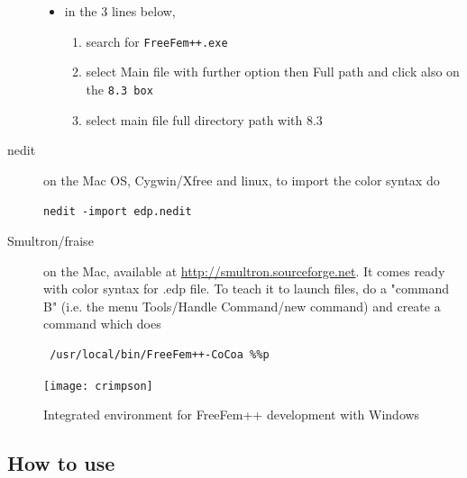 \documentclass[a4paper,twoside,12pt]{book}
\begin{document}
\begin{description}
\begin{itemize}
\item in the 3 lines below,
\begin{enumerate}
\item search for \texttt{FreeFem++.exe}
\item select Main file with further option then Full path and click also on the \texttt{8.3 box}
\item select main file full directory path with 8.3
\end{enumerate}
\end{itemize}
\item[nedit] on the Mac OS, Cygwin/Xfree and linux, to import the color syntax do

\verb!nedit -import edp.nedit!

 \item[Smultron/fraise] on the Mac, available at \url{http://smultron.sourceforge.net}. It comes ready with color syntax for .edp file.  To teach it to launch \freefempp files, do a "command B" (i.e. the menu Tools/Handle Command/new command) and create a command which does
\begin{verbatim}
 /usr/local/bin/FreeFem++-CoCoa %%p
\end{verbatim}

\end{description}
%
\begin{figure}[htbp]
\begin{center}
\texttt{[image: crimpson]}
\caption{ Integrated environment for FreeFem++ development with Windows
   \label{fig:mi}}
\end{center}
\end{figure}


\subsection{How to use \freefempp}

\end{document}
